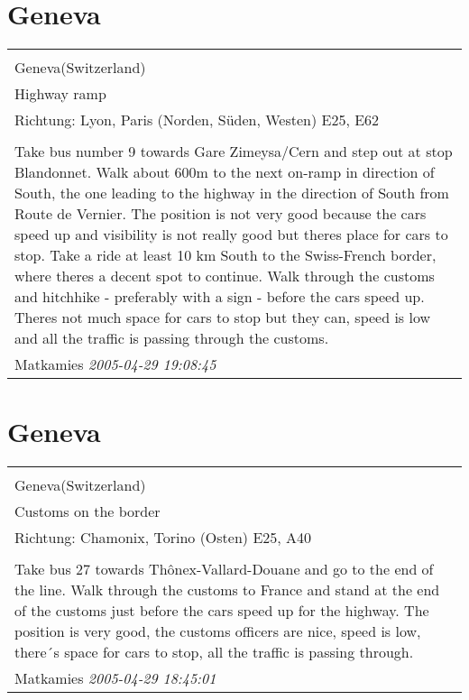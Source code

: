 \documentclass[a4paper,12pt]{article}
\begin{document}
\section{Geneva}
\begin{tabular}{|p{13cm}|}
\hline\\
Geneva(Switzerland)\\
Highway ramp\\
Richtung: Lyon, Paris (Norden, Süden, Westen) E25, E62 \\
\hline\\
Take bus number 9 towards Gare Zimeysa/Cern and step out at stop Blandonnet. Walk about 600m to the next on-ramp in direction of South, the one leading to the highway in the direction of South from Route de Vernier. The position is not very good because the cars speed up and visibility is not really good but theres place for cars to stop. Take a ride at least 10 km South to the Swiss-French border, where theres a decent spot to continue. Walk through the customs and hitchhike - preferably with a sign - before the cars speed up. Theres not much space for cars to stop but they can, speed is low and all the traffic is passing through the customs. \\
Matkamies \textit{ 2005-04-29 19:08:45 }\\\hline
\end{tabular}


\section{Geneva}
\begin{tabular}{|p{13cm}|}
\hline\\
Geneva(Switzerland)\\
Customs on the border\\
Richtung: Chamonix, Torino (Osten) E25, A40 \\
\hline\\
Take bus 27 towards Thônex-Vallard-Douane and go to the end of the line. Walk through the customs to France and stand at the end of the customs just before the cars speed up for the highway. The position is very good, the customs officers are nice, speed is low, there´s space for cars to stop, all the traffic is passing through. \\
Matkamies \textit{ 2005-04-29 18:45:01 }\\\hline
\end{tabular}
\end{document}
